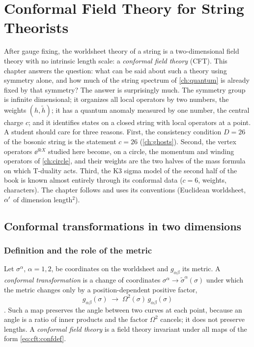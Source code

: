 \chapter{Conformal Field Theory for String Theorists}\label{ch:cft}

After gauge fixing, the worldsheet theory of a string is a two-dimensional field theory with
no intrinsic length scale: a \emph{conformal field theory} (CFT). This chapter answers the
question: what can be said about such a theory using symmetry alone, and how much of the
string spectrum of \cref{ch:quantum} is already fixed by that symmetry? The answer is
surprisingly much. The symmetry group is infinite dimensional; it organizes all local
operators by two numbers, the weights $(h,\tilde h)$; it has a quantum anomaly measured by
one number, the central charge $c$; and it identifies states on a closed string with local
operators at a point. A student should care for three reasons. First, the consistency
condition $D=26$ of the bosonic string is the statement $c=26$ (\cref{ch:ghosts}). Second, the
vertex operators $\ee^{\ii kX}$ studied here become, on a circle, the momentum and winding
operators of \cref{ch:circle}, and their weights are the two halves of the mass formula on which
T-duality acts. Third, the K3 sigma model of the second half of the book is known almost entirely
through its conformal data ($c=6$, weights, characters). The chapter follows
 and uses its conventions (Euclidean worldsheet, $\alpha'$ of
dimension length$^2$).

\section{Conformal transformations in two dimensions}\label{sec:cft:conformal}

\subsection{Definition and the role of the metric}

Let $\sigma^\alpha$, $\alpha=1,2$, be coordinates on the worldsheet and $g_{\alpha\beta}$ its
metric. A \emph{conformal transformation} is a change of
coordinates $\sigma^\alpha\to\tilde\sigma^\alpha(\sigma)$ under which the metric changes only
by a position-dependent positive factor,
\begin{equation}\label{eq:cft:confdef}
  g_{\alpha\beta}(\sigma)\;\longrightarrow\;\Omega^2(\sigma)\,g_{\alpha\beta}(\sigma)
\end{equation}
. Such a map preserves the angle between two curves at each
point, because an angle is a ratio of inner products and the factor $\Omega^2$ cancels; it
does not preserve lengths. A \emph{conformal field theory} is
a field theory invariant under all maps of the form \eqref{eq:cft:confdef}.


